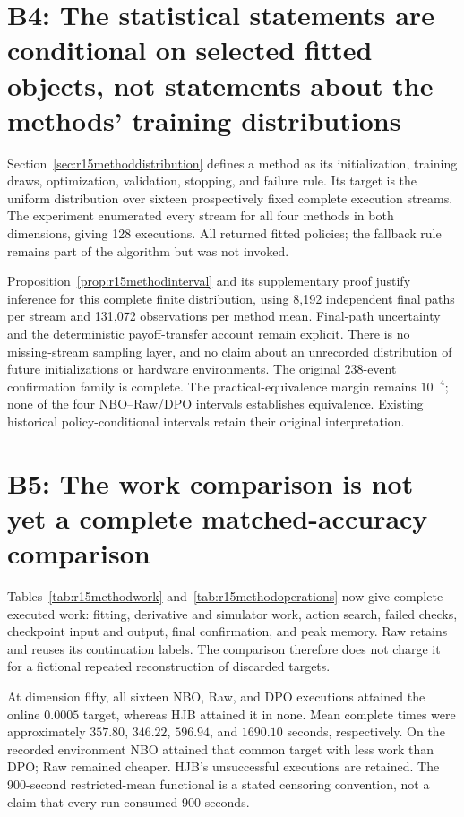 \section*{B4: The statistical statements are conditional on selected fitted objects, not statements about the methods' training distributions}
Section~\ref{sec:r15methoddistribution} defines a method as its initialization, training draws, optimization, validation, stopping, and failure rule. Its target is the uniform distribution over sixteen prospectively fixed complete execution streams. The experiment enumerated every stream for all four methods in both dimensions, giving 128 executions. All returned fitted policies; the fallback rule remains part of the algorithm but was not invoked.

Proposition~\ref{prop:r15methodinterval} and its supplementary proof justify inference for this complete finite distribution, using 8,192 independent final paths per stream and 131,072 observations per method mean. Final-path uncertainty and the deterministic payoff-transfer account remain explicit. There is no missing-stream sampling layer, and no claim about an unrecorded distribution of future initializations or hardware environments. The original 238-event confirmation family is complete. The practical-equivalence margin remains $10^{-4}$; none of the four NBO--Raw/DPO intervals establishes equivalence. Existing historical policy-conditional intervals retain their original interpretation.

\section*{B5: The work comparison is not yet a complete matched-accuracy comparison}
Tables~\ref{tab:r15methodwork} and~\ref{tab:r15methodoperations} now give complete executed work: fitting, derivative and simulator work, action search, failed checks, checkpoint input and output, final confirmation, and peak memory. Raw retains and reuses its continuation labels. The comparison therefore does not charge it for a fictional repeated reconstruction of discarded targets.

At dimension fifty, all sixteen NBO, Raw, and DPO executions attained the online $0.0005$ target, whereas HJB attained it in none. Mean complete times were approximately $357.80$, $346.22$, $596.94$, and $1690.10$ seconds, respectively. On the recorded environment NBO attained that common target with less work than DPO; Raw remained cheaper. HJB's unsuccessful executions are retained. The 900-second restricted-mean functional is a stated censoring convention, not a claim that every run consumed 900 seconds.


